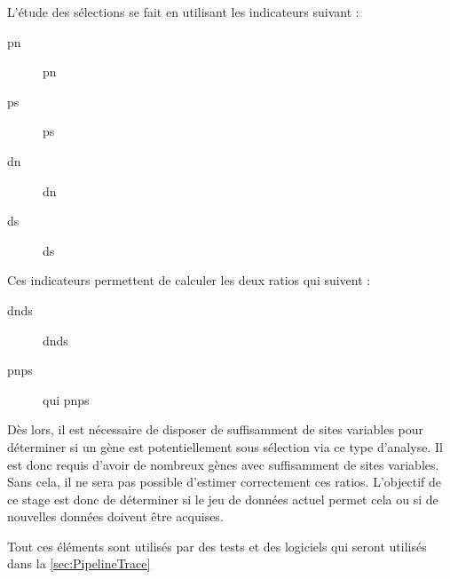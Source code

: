 \documentclass[../main]{subfiles} %
\begin{document}
L'étude des sélections se fait en utilisant les indicateurs suivant :


\begin{description}
    \item [\acrshort{pn}] \acrlong{pn}
    \item [\acrshort{ps}] \acrlong{ps}
    \item [\acrshort{dn}] \acrlong{dn}
    \item [\acrshort{ds}] \acrlong{ds}
\end{description}


Ces indicateurs permettent de calculer les deux ratios qui suivent :
\begin{description}
    \item [\acrshort{dnds}] \acrlong{dnds}
    \item [\acrshort{pnps}] qui \acrlong{pnps}
\end{description}

Dès lors, il est nécessaire de disposer de suffisamment de sites variables pour déterminer si un gène est potentiellement sous sélection via ce type d'analyse. Il est donc requis d'avoir de nombreux gènes avec suffisamment de sites variables. Sans cela, il ne sera pas possible d'estimer correctement ces ratios. 
L'objectif de ce stage est donc de déterminer si le jeu de données actuel permet cela ou si de nouvelles données doivent être acquises.

Tout ces éléments sont utilisés par des tests et des logiciels qui seront utilisés dans la  \cref{sec:PipelineTrace}


\end{document}
